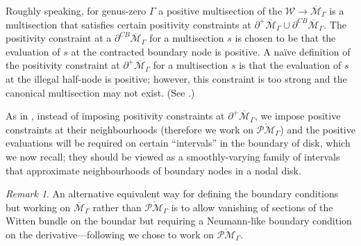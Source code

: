 \documentclass[11pt]{amsart}
\theoremstyle{definition}
\theoremstyle{remark}
\newtheorem{rmk}[dummy]{Remark}
\newcommand{\oPMb}{{\overline{\mathcal{PM}}}}
\newcommand{\<}{\left<}
\renewcommand{\>}{\right>}
\numberwithin{equation}{section}
\def\Mbar{{\overline{\mathcal M}}}
\begin{document}
Roughly speaking, for genus-zero $\Gamma$ a positive multisection of the  $\mathcal W\to \Mbar_\Gamma$ is a multisection that satisfies certain positivity constraints at $\partial^+\Mbar_\Gamma\cup \partial^{CB}\Mbar_\Gamma$.  The positivity constraint at a $\partial^{CB}\Mbar_\Gamma$ for a multisection $s$ is chosen to be that the evaluation of $s$ at the contracted boundary node is positive. A na\"ive definition of the positivity constraint at $\partial^+\Mbar_\Gamma$ for a multisection $s$ is that the evaluation of $s$ at the illegal half-node is positive; however, this constraint is too strong and the canonical multisection %
may not exist. (See \cite[Example 3.23]{BCT2}.)

As %
in \cite{BCT2}, instead of imposing 
positivity constraints at $\partial^+\Mbar_\Gamma$, we impose positive constraints at their neighbourhoods (therefore we work on $\oPMb_\Gamma$) and the positive evaluations will be required on certain ``intervals'' in the boundary of disk, which we now recall; they should be viewed as a smoothly-varying family of intervals that approximate  neighbourhoods of boundary nodes in a nodal disk. 

\begin{rmk}
An alternative equivalent way %
for defining the boundary conditions but working on $\Mbar_{\Gamma}$ rather than $\oPMb_{\Gamma}$ is to allow vanishing of sections of the Witten bundle on %
the boundar but %
requiring a Neumann-like boundary condition on %
the derivative---following \cite{BCT2}
 we %
chose to work on $\oPMb_{\Gamma}.$\end{rmk}
\end{document}
